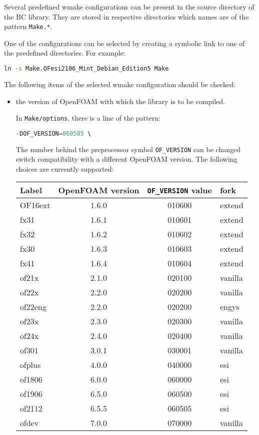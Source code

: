 \documentclass{sd_report}
\begin{document}
Several predefined wmake configurations can be present in the source directory of the BC library.
They are stored in respective directories which names are of the pattern \texttt{Make.*}.

One of the configurations can be selected by creating a symbolic link to one of the predefined directories. For example:

\begin{lstlisting}[language=bash]
ln -s Make.OFesi2106_Mint_Debian_Edition5 Make
\end{lstlisting}

The following items of the selected wmake configuration should be checked:
\begin{itemize}
\item the version of OpenFOAM with which the library is to be compiled.

In \texttt{Make/options}, there is a line of the pattern:
\begin{lstlisting}[language=c++]
    -DOF_VERSION=060505 \
\end{lstlisting}

The number behind the preprocessor symbol \texttt{OF\_VERSION} can be changed switch compatibility with a different OpenFOAM version. The following choices are currently supported:

\begin{tabular}{lccl}
\hline
Label & OpenFOAM version & \texttt{OF\_VERSION} value & fork\\
\hline
OF16ext &	1.6.0	& 010600	&extend\\
fx31	&	1.6.1	& 010601	&extend\\
fx32	&	1.6.2	& 010602	&extend\\
fx30	&	1.6.3	& 010603&	extend\\
fx41	&	1.6.4	& 010604&	extend\\
of21x	&	2.1.0	& 020100&	vanilla\\
of22x	&	2.2.0	& 020200&	vanilla\\
of22eng	& 2.2.0	& 020200	&engys\\
of23x	&	2.3.0	&020300	&vanilla\\
of24x	&	2.4.0	&020400	&vanilla\\
of301	&	3.0.1	&030001	&vanilla\\
ofplus	&	4.0.0	&040000	&esi\\
of1806	&	6.0.0	&060000	&esi\\
of1906	&	6.5.0	&060500	&esi\\
of2112	&	6.5.5	&060505	&esi\\
ofdev	&	7.0.0	&070000	&vanilla\\
\hline
\end{tabular}


\end{itemize}
\end{document}
